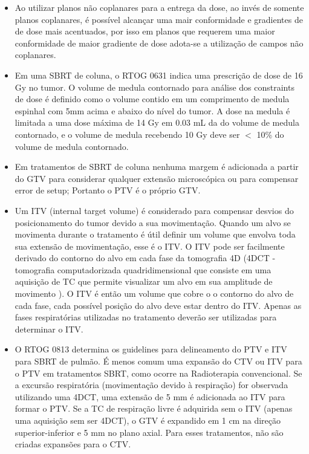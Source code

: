 \documentclass[11pt,a4paper]{article}
\newcounter{exemplo}
\begin{document}
\begin{exemplo}
\begin{itemize}
        \item Ao utilizar planos não coplanares para a entrega da dose, ao invés de somente planos coplanares, é possível alcançar uma mair conformidade e gradientes de de dose mais acentuados, por isso em planos que requerem uma maior conformidade de maior gradiente de dose adota-se a utilização de campos não coplanares.
        
        \item Em uma SBRT de coluna, o RTOG 0631 indica uma prescrição de dose de 16 Gy no tumor. O volume de medula contornado para análise dos constraints de dose é definido como o volume contido em um comprimento de medula espinhal com 5mm acima e abaixo do nível do tumor. A dose na medula é limitada a uma dose máxima de 14 Gy em 0.03 mL da do volume de medula contornado, e o volume de medula recebendo 10 Gy deve ser $<$ 10\% do volume de medula contornado. 
        
        \item Em tratamentos de SBRT de coluna nenhuma margem é adicionada a partir do GTV para considerar qualquer extensão microscópica ou para compensar error de setup; Portanto o PTV é o próprio GTV.
        
        \item Um ITV (internal target volume) é considerado para compensar desvios do posicionamento do tumor devido a sua movimentação. Quando um alvo se movimenta durante o tratamento é útil definir um volume que envolva toda sua extensão de movimentação, esse é o ITV. O ITV pode ser facilmente derivado do contorno do alvo em cada fase da tomografia 4D (4DCT - tomografia computadorizada quadridimensional que consiste em uma aquisição de TC que permite visualizar um alvo em sua amplitude de movimento ). O ITV é então um volume que cobre o o contorno do alvo de cada fase, cada possível posição do alvo deve estar dentro do ITV. Apenas as fases respiratórias utilizadas no tratamento deverão ser utilizadas para determinar o ITV.
        
        \item O RTOG 0813 determina os guidelines para delineamento do PTV e ITV para SBRT de pulmão. É menos comum uma expansão do CTV ou ITV para o PTV em tratamentos SBRT, como ocorre na Radioterapia convencional. Se a excursão respiratória (movimentação devido à respiração) for observada utilizando uma 4DCT, uma extensão de 5 mm é adicionada ao ITV para formar o PTV. Se a TC de respiração livre é adquirida sem o ITV (apenas uma aquisição sem ser 4DCT), o GTV é expandido em 1 cm na direção superior-inferior e 5 mm no plano axial. Para esses tratamentos, não são criadas expansões para o CTV.
        

\end{itemize}
\end{exemplo}
\end{document}
